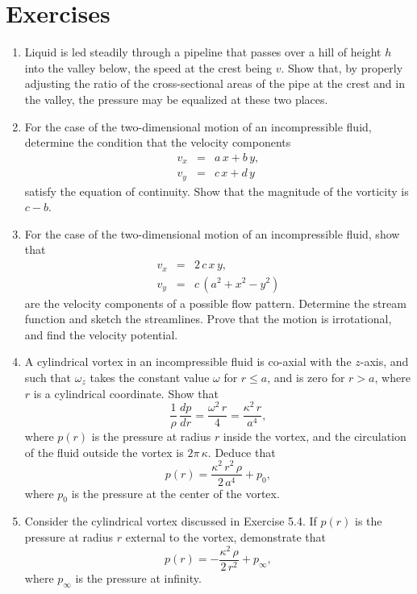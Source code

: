 \section{Exercises}
{\small 
\renewcommand{\theenumi}{5.\arabic{enumi}}
\begin{enumerate}
\item Liquid is led steadily through a pipeline that passes over a hill of height $h$ into the valley below, the
speed at the crest being $v$. Show that, by properly adjusting the ratio of the cross-sectional areas of the pipe
at the crest and in the valley, the pressure may be equalized at these two places. 

\item For the case of the two-dimensional motion of an incompressible fluid, determine the condition that the velocity components
\begin{eqnarray}
v_x &=& a\,x+b\,y,\nonumber\\[0.5ex]
v_y&=&c\,x+d\,y\nonumber
\end{eqnarray}
satisfy the equation of continuity. Show that the magnitude of the vorticity is $c-b$. 

\item For the case of the two-dimensional motion of an incompressible fluid, show that
\begin{eqnarray}
v_x &=& 2\,c\,x\,y,\nonumber\\[0.5ex]
v_y&=& c\,(a^2+x^2-y^2)\nonumber
\end{eqnarray}
are the velocity components of a possible flow pattern. Determine the stream function and sketch the streamlines. 
Prove that the motion is irrotational, and find the velocity potential. 

\item A cylindrical vortex in an incompressible fluid is co-axial with the $z$-axis, and such that $\omega_z$ takes the constant value
$\omega$ for $r\leq a$, and is zero for $r>a$, where $r$ is a cylindrical coordinate.  Show that
$$
\frac{1}{\rho}\,\frac{dp}{dr} = \frac{\omega^2\,r}{4} = \frac{\kappa^2\,r}{a^4},
$$
where $p(r)$ is the pressure at radius $r$ inside the vortex, and the circulation of the fluid outside the vortex is $2\pi\,\kappa$. 
Deduce that
$$
p(r) = \frac{\kappa^2\,r^2\,\rho}{2\,a^4}+ p_0,
$$
where $p_0$ is the pressure at the center of the vortex. 

\item Consider the cylindrical vortex discussed in Exercise 5.4. If $p(r)$ is the pressure at radius $r$ external to the
vortex, demonstrate that
$$
p(r) = -\frac{\kappa^2\,\rho}{2\,r^2}+ p_\infty,
$$
where $p_\infty$ is the pressure at infinity. 


\end{enumerate}}
